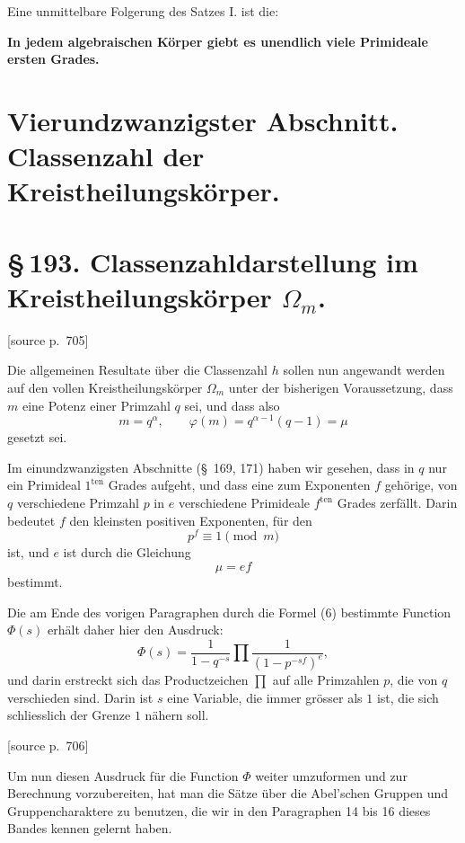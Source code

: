 \documentclass[11pt]{article}
\newcommand{\srcpage}[1]{\par\medskip\noindent\textsf{[source p.~#1]}\par\smallskip}
\begin{document}
Eine unmittelbare Folgerung des Satzes I. ist die:
\begin{center}
\textbf{In jedem algebraischen Körper giebt es unendlich viele Primideale ersten Grades.}
\end{center}

\section*{Vierundzwanzigster Abschnitt.\\Classenzahl der Kreistheilungskörper.}
\section*{\S\,193. Classenzahldarstellung im Kreistheilungskörper $\Omega_m$.}

\srcpage{705}
Die allgemeinen Resultate über die Classenzahl $h$ sollen nun angewandt werden auf den vollen Kreistheilungskörper $\Omega_m$ unter der bisherigen Voraussetzung, dass $m$ eine Potenz einer Primzahl $q$ sei, und dass also
\begin{equation}
m=q^\alpha,\qquad \varphi(m)=q^{\alpha-1}(q-1)=\mu
\tag{1}
\end{equation}
gesetzt sei.

Im einundzwanzigsten Abschnitte (\S~169, 171) haben wir gesehen, dass in $q$ nur ein Primideal $1^{\mathrm{ten}}$ Grades aufgeht, und dass eine zum Exponenten $f$ gehörige, von $q$ verschiedene Primzahl $p$ in $e$ verschiedene Primideale $f^{\mathrm{ten}}$ Grades zerfällt. Darin bedeutet $f$ den kleinsten positiven Exponenten, für den
\begin{equation}
p^f\equiv1\pmod m
\tag{2}
\end{equation}
ist, und $e$ ist durch die Gleichung
\begin{equation}
\mu=ef
\tag{3}
\end{equation}
bestimmt.

Die am Ende des vorigen Paragraphen durch die Formel (6) bestimmte Function $\Phi(s)$ erhält daher hier den Ausdruck:
\begin{equation}
\Phi(s)=\frac1{1-q^{-s}}\prod\frac1{(1-p^{-sf})^e},
\tag{4}
\end{equation}
und darin erstreckt sich das Productzeichen $\prod$ auf alle Primzahlen $p$, die von $q$ verschieden sind. Darin ist $s$ eine Variable, die immer grösser als $1$ ist, die sich schliesslich der Grenze $1$ nähern soll.

\srcpage{706}
Um nun diesen Ausdruck für die Function $\Phi$ weiter umzuformen und zur Berechnung vorzubereiten, hat man die Sätze über die Abel'schen Gruppen und Gruppencharaktere zu benutzen, die wir in den Paragraphen 14 bis 16 dieses Bandes kennen gelernt haben.
\end{document}
